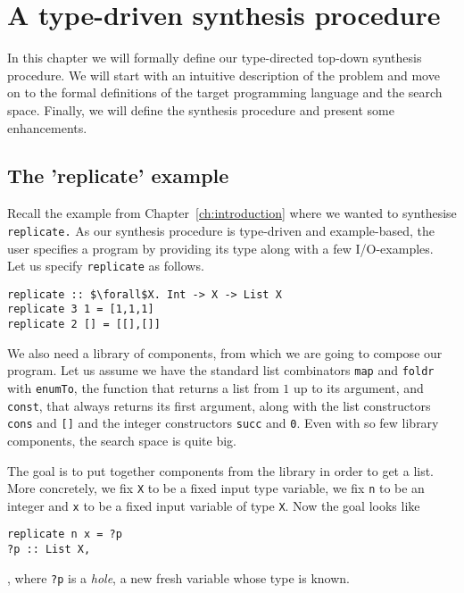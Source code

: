 \lstset{style=plain}

\chapter{A type-driven synthesis procedure} \label{ch:definitions}

In this chapter we will formally define our type-directed top-down synthesis procedure. We will start with an intuitive description of the problem and move on to the formal definitions of the target programming language and the search space. Finally, we will define the synthesis procedure and present some enhancements.

\section{The 'replicate' example}

Recall the example from Chapter~\ref{ch:introduction} where we wanted to synthesise \lstinline?replicate.? As our synthesis procedure is type-driven and example-based, the user specifies a program by providing its type along with a few I/O-examples.\\
Let us specify \lstinline?replicate? as follows.
\begin{lstlisting}[style=plain]
replicate :: $\forall$X. Int -> X -> List X
replicate 3 1 = [1,1,1]
replicate 2 [] = [[],[]]
\end{lstlisting}

We also need a library of components, from which we are going to compose our program. Let us assume we have the standard list combinators \lstinline?map? and \lstinline?foldr? with \lstinline?enumTo?, the function that returns a list from $1$ up to its argument, and \lstinline?const?, that always returns its first argument, along with the list constructors \lstinline?cons? and \lstinline?[]? and the integer constructors \lstinline?succ? and \lstinline?0?. Even with so few library components, the search space is quite big.

The goal is to put together components from the library in order to get a list. More concretely, we fix \lstinline?X? to be a fixed input type variable, we fix \lstinline?n? to be an integer and \lstinline?x? to be a fixed input variable of type \lstinline?X?. Now the goal looks like
\begin{lstlisting}[style=plain]
replicate n x = ?p
?p :: List X,
\end{lstlisting},
where \lstinline!?p! is a \emph{hole}, a new fresh variable whose type is known.

